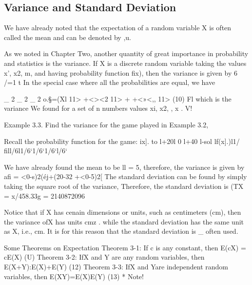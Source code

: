 
\subsection*{Variance and Standard Deviation}
We have already noted that the expectation of a random variable X is
often called the mean and can be denoted by ,u. 

As we noted in Chapter Two, another quantity of great importance in probability and statistics is the variance. 
If X is a discrete random variable taking the values x’, x2,
m, and having probability function ﬁx), then the variance is given
by
6%
/=1 t
In the special case where all the probabilities are equal, we have


_ 2 _ 2  _ 2
o.§=(Xl 11> +<><2 11> + +<»<,, 11> (10)
Fl
which is the variance We found for a set of n numbers values xi, x2,
, x .
V!

Example 3.3. Find the variance for the game played in Example
3.2,

Recall the probability function for the game:
ix]. to l+20l 0 l+40\0 l-sol
lf(x].)l1/ﬁll/6l1/6‘1/6‘1/6‘l/6‘

We have already found the mean to be ll = 5, therefore, the variance is
given by
aﬁ = <0-s)2(éj+(20-32%
+<0-5)2[%
The standard deviation can be found by simply taking the square root of
the variance, Therefore, the standard deviation is
(TX = x/458.33g = 2140872096

Notice that if X has cenain dimensions or units, such
as centimeters (cm), then the variance ofX has units cmz .
while the standard deviation has the same unit as X, i.e., 
cm. It is for this reason that the standard deviation is
_
often used. 



Some Theorems on Expectation
Theorem 3-1: If c is any constant, then
E(cX) = cE(X) (U)
Theorem 3-2: IfX and Y are any random variables, then
E(X+Y):E(X)+E(Y) (12)
Theorem 3-3: IfX and Yare independent random variables, then
E(XY)=E(X)E(Y) (13)
* Note!

